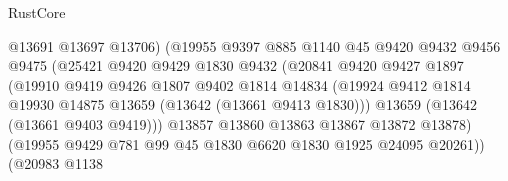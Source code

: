 \begin{lexlean}{RustCore}
\begin{coremodule}
                                    @13691
                                    @13697
                                    @13706)
                                  (@19955
                                    @9397
                                    @885
                                    @1140
                                    @45
                                    @9420
                                    @9432
                                    @9456
                                    @9475
                                    (@25421
                                      @9420
                                      @9429
                                      @1830
                                      @9432
                                      (@20841
                                        @9420
                                        @9427
                                        @1897
                                        (@19910
                                          @9419
                                          @9426
                                          @1807
                                          @9402
                                          @1814
                                          @14834
                                          (@19924
                                            @9412
                                            @1814
                                            @19930
                                            @14875
                                            @13659
                                            (@13642 (@13661 @9413 @1830)))
                                          @13659
                                          (@13642 (@13661 @9403 @9419)))
                                        @13857
                                        @13860
                                        @13863
                                        @13867
                                        @13872
                                        @13878)
                                      (@19955
                                        @9429
                                        @781
                                        @99
                                        @45
                                        @1830
                                        @6620
                                        @1830
                                        @1925
                                        @24095
                                        @20261))
                                    (@20983
                                      @1138

\end{coremodule}
\end{lexlean}
